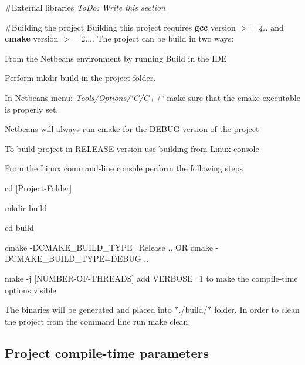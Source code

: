 \#\+External libraries {\itshape To\+Do\+: Write this section}

\#\+Building the project Building this project requires {\bfseries gcc} version $>$= {\itshape 4..} and {\bfseries cmake} version $>$= 2.... The project can be build in two ways\+:


\begin{DoxyItemize}
\item From the Netbeans environment by running Build in the I\+D\+E
\begin{DoxyItemize}
\item Perform {\ttfamily mkdir build} in the project folder.
\item In Netbeans menu\+: {\itshape Tools/\+Options/\char`\"{}\+C/\+C++\char`\"{}} make sure that the cmake executable is properly set.
\item Netbeans will always run cmake for the D\+E\+B\+U\+G version of the project
\item To build project in R\+E\+L\+E\+A\+S\+E version use building from Linux console
\end{DoxyItemize}
\item From the Linux command-\/line console perform the following steps
\begin{DoxyItemize}
\item {\ttfamily cd \mbox{[}Project-\/\+Folder\mbox{]}}
\item {\ttfamily mkdir build}
\item {\ttfamily cd build}
\item {\ttfamily cmake -\/\+D\+C\+M\+A\+K\+E\+\_\+\+B\+U\+I\+L\+D\+\_\+\+T\+Y\+P\+E=Release ..} O\+R {\ttfamily cmake -\/\+D\+C\+M\+A\+K\+E\+\_\+\+B\+U\+I\+L\+D\+\_\+\+T\+Y\+P\+E=D\+E\+B\+U\+G ..}
\item {\ttfamily make -\/j \mbox{[}N\+U\+M\+B\+E\+R-\/\+O\+F-\/\+T\+H\+R\+E\+A\+D\+S\mbox{]}} add {\ttfamily V\+E\+R\+B\+O\+S\+E=1} to make the compile-\/time options visible
\end{DoxyItemize}
\end{DoxyItemize}

The binaries will be generated and placed into $\ast$./build/$\ast$ folder. In order to clean the project from the command line run {\ttfamily make clean}.

\subsection*{Project compile-\/time parameters}

